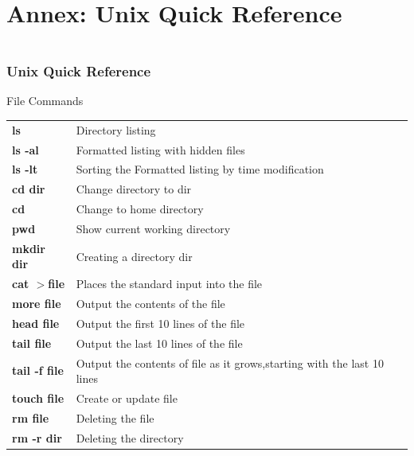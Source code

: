 \documentclass[10pt, hyperref={unicode=true,pdfusetitle, bookmarks=true,bookmarksnumbered=false,bookmarksopen=false, breaklinks=false,pdfborder={0 0 1},backref=true,colorlinks=true,linkcolor=darkblue,pageanchor}]{beamer}
\begin{document}
\section{{\bf{Annex: Unix Quick Reference}}}
\begin{frame}
\begin{small}
\begin{columns}[c] 
\tableofcontents[sections={1-9},currentsection, currentsubsection]
\tableofcontents[sections={10-16},currentsection, currentsubsection]
\end{columns}
\end{small}
\end{frame}
\begin{frame}
\frametitle{Unix Quick Reference}
\begin{block}{File Commands}

\begin{tabular}{ll}
\textbf{ls}              & Directory listing                                                     \tabularnewline
\textbf{ls -al}          & Formatted listing with hidden files                                   \tabularnewline
\textbf{ls -lt}          & Sorting the Formatted listing by time modification                    \tabularnewline
\textbf{cd dir}          & Change directory to dir                                               \tabularnewline
\textbf{cd}              & Change to home directory                                              \tabularnewline
\textbf{pwd}             & Show current working directory                                        \tabularnewline
\textbf{mkdir dir}       & Creating a directory dir                                              \tabularnewline
\textbf{cat $>$file}     & Places the standard input into the file                               \tabularnewline
\textbf{more file}       & Output the contents of the file                                       \tabularnewline
\textbf{head file}       & Output the first 10 lines of the file                                 \tabularnewline
\textbf{tail file}       & Output the last 10 lines of the file                                  \tabularnewline
\textbf{tail -f file}    & Output the contents of file as it grows,starting with the last 10 lines \tabularnewline
\textbf{touch file}      & Create or update file                                                 \tabularnewline
\textbf{rm file}         & Deleting the file                                                     \tabularnewline
\textbf{rm -r dir}       & Deleting the directory                                                \tabularnewline
\end{tabular}

\end{block}
\end{frame}
\end{document}
